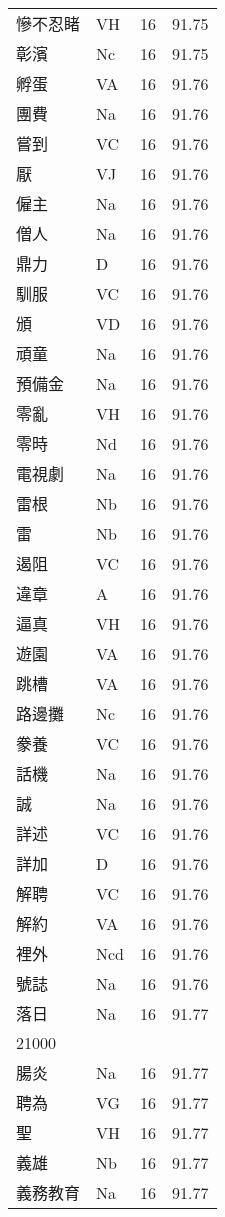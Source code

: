 \documentclass[twocolumn]{book}
\begin{document}
\begin{supertabular}{llrr}
慘不忍睹 & VH & 16 &  91.75\\
彰濱 & Nc & 16 &  91.75\\
孵蛋 & VA & 16 &  91.76\\
團費 & Na & 16 &  91.76\\
嘗到 & VC & 16 &  91.76\\
厭 & VJ & 16 &  91.76\\
僱主 & Na & 16 &  91.76\\
僧人 & Na & 16 &  91.76\\
鼎力 & D & 16 &  91.76\\
馴服 & VC & 16 &  91.76\\
頒 & VD & 16 &  91.76\\
頑童 & Na & 16 &  91.76\\
預備金 & Na & 16 &  91.76\\
零亂 & VH & 16 &  91.76\\
零時 & Nd & 16 &  91.76\\
電視劇 & Na & 16 &  91.76\\
雷根 & Nb & 16 &  91.76\\
雷 & Nb & 16 &  91.76\\
遏阻 & VC & 16 &  91.76\\
違章 & A & 16 &  91.76\\
逼真 & VH & 16 &  91.76\\
遊園 & VA & 16 &  91.76\\
跳槽 & VA & 16 &  91.76\\
路邊攤 & Nc & 16 &  91.76\\
豢養 & VC & 16 &  91.76\\
話機 & Na & 16 &  91.76\\
誠 & Na & 16 &  91.76\\
詳述 & VC & 16 &  91.76\\
詳加 & D & 16 &  91.76\\
解聘 & VC & 16 &  91.76\\
解約 & VA & 16 &  91.76\\
裡外 & Ncd & 16 &  91.76\\
號誌 & Na & 16 &  91.76\\
落日 & Na & 16 &  91.77\\
21000\\
腸炎 & Na & 16 &  91.77\\
聘為 & VG & 16 &  91.77\\
聖 & VH & 16 &  91.77\\
義雄 & Nb & 16 &  91.77\\
義務教育 & Na & 16 &  91.77\\

\end{supertabular}
\end{document}
